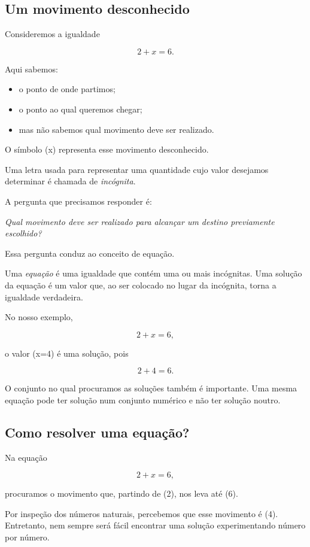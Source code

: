 \documentclass[12pt,a4paper]{article}
\begin{document}
\subsection{Um movimento desconhecido}

Consideremos a igualdade

\[
2+x=6.
\]

Aqui sabemos:

\begin{itemize}
\item o ponto de onde partimos;
\item o ponto ao qual queremos chegar;
\item mas não sabemos qual movimento deve ser realizado.
\end{itemize}

O símbolo (x) representa esse movimento desconhecido.

Uma letra usada para representar uma quantidade cujo valor desejamos
determinar é chamada de \emph{incógnita}.

A pergunta que precisamos responder é:

\begin{center}
\emph{Qual movimento deve ser realizado para alcançar um destino
previamente escolhido?}
\end{center}

Essa pergunta conduz ao conceito de equação.

Uma \emph{equação} é uma igualdade que contém uma ou mais incógnitas. Uma
solução da equação é um valor que, ao ser colocado no lugar da incógnita,
torna a igualdade verdadeira.

No nosso exemplo,

\[
2+x=6,
\]

o valor (x=4) é uma solução, pois

\[
2+4=6.
\]

O conjunto no qual procuramos as soluções também é importante. Uma mesma
equação pode ter solução num conjunto numérico e não ter solução noutro.

\subsection{Como resolver uma equação?}

Na equação

\[
2+x=6,
\]

procuramos o movimento que, partindo de (2), nos leva até (6).

Por inspeção dos números naturais, percebemos que esse movimento é (4).
Entretanto, nem sempre será fácil encontrar uma solução experimentando
número por número.
\end{document}
